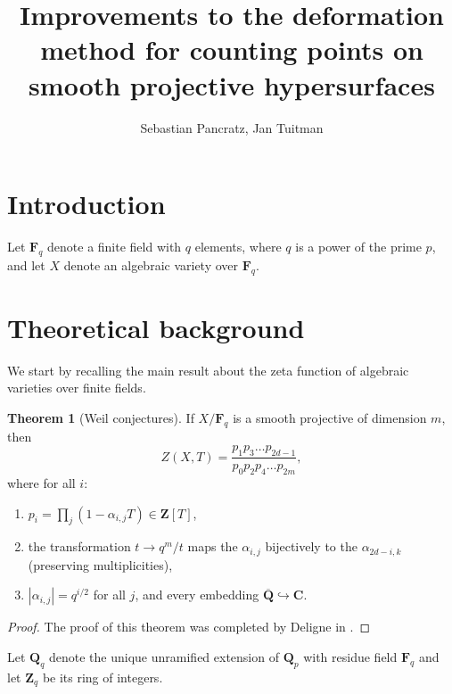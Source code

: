 \documentclass[a4paper,11pt]{article}
\author{Sebastian Pancratz, Jan Tuitman}
\title{Improvements to the deformation method for counting points on smooth projective hypersurfaces}
\numberwithin{equation}{section}
\newcommand{\ZZ}{\mathbf{Z}} %
\newcommand{\QQ}{\mathbf{Q}} %
\newcommand{\CC}{\mathbf{C}} %
\newcommand{\FF}{\mathbf{F}} %
\theoremstyle{definition}
\newtheorem{thm}{Theorem}[section]
\begin{document}
\maketitle

\tableofcontents


\section{Introduction}
\label{sec:Introduction}

Let $\FF_q$ denote a finite field with $q$ elements, where $q$ is a power of the prime $p$, 
and let $X$ denote an algebraic variety over $\FF_q$.


\newpage

\section{Theoretical background}
\label{sec:Background}

We start by recalling the main result about the zeta function of algebraic
varieties over finite fields.

\begin{thm}[Weil conjectures] If $X/\FF_q$ is a smooth projective of dimension $m$, 
then \label{thm:weildeligne}
\[
Z(X,T)=\frac{p_1 p_3 \ldots p_{2d-1}}{p_0 p_2 p_4 \ldots p_{2m}},
\]
where for all $i$:
\begin{enumerate}
\item $p_i = \prod_j (1-\alpha_{i,j}T) \in \ZZ[T]$,
\item the transformation $t \rightarrow q^m/t$ maps the $\alpha_{i,j}$ bijectively to 
      the $\alpha_{2d-i,k}$ (preserving multiplicities),
\item $|\alpha_{i,j}| = q^{i/2}$ for all $j$, and every embedding $\overline{\QQ} \hookrightarrow \CC$. 
\end{enumerate}
\end{thm}

\begin{proof}
The proof of this theorem was completed by Deligne in \cite{Deligne1974}.
\end{proof}

Let $\QQ_q$ denote the unique unramified extension of $\QQ_p$ with residue field $\FF_q$ and let
$\ZZ_q$ be its ring of integers.
\end{document}
